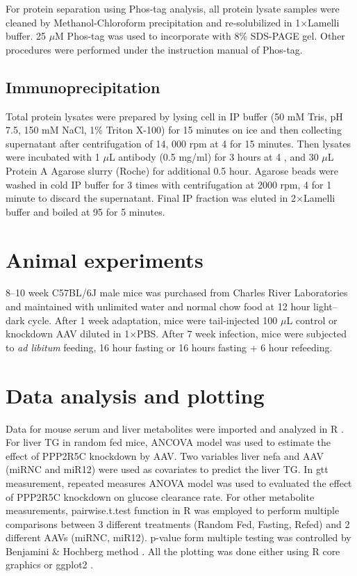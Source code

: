 For protein separation using Phos-tag\textsuperscript{\textregistered} analysis, all protein lysate samples were cleaned by Methanol-Chloroform precipitation  \cite{wessel_method_1984} and re-solubilized in 1$\times$Lamelli buffer. 25 $\mu$M Phos-tag\textsuperscript{\textregistered} was used to incorporate with 8\% SDS-PAGE gel. Other procedures were performed under the instruction manual of Phos-tag\textsuperscript{\textregistered}. 

\subsection{Immunoprecipitation}

Total protein lysates were prepared by lysing cell in IP buffer (50 mM Tris, pH 7.5, 150 mM NaCl, 1\% Triton X-100) for 15 minutes on ice and then collecting supernatant after centrifugation of 14, 000 rpm at 4 \celsius{} for 15 minutes. Then lysates were incubated with 1 $\mu$L antibody (0.5 mg/ml) for 3 hours at 4 \celsius, and 30 $\mu$L Protein A Agarose slurry (Roche) for additional 0.5 hour. Agarose beads were washed in cold IP buffer for 3 times with centrifugation at 2000 rpm, 4 \celsius{} for 1 minute to discard the supernatant. Final IP fraction was eluted in 2$\times$Lamelli buffer and boiled at 95 \celsius{} for 5 minutes.

\section{Animal experiments}

8--10 week C57BL/6J male mice was purchased from Charles River Laboratories and maintained with unlimited water and normal chow food at 12 hour light--dark cycle. After 1 week adaptation, mice were tail-injected 100 $\mu$L control or knockdown \gls{AAV} diluted in 1$\times$PBS. After 7 week infection, mice were subjected to \textit{ad libitum} feeding, 16 hour fasting or 16 hours fasting + 6 hour refeeding.

\section{Data analysis and plotting}

Data for mouse serum and liver metabolites were imported and analyzed in R  \cite{r_core_team_r:_2014}. For liver TG in random fed mice, ANCOVA model was used to estimate the effect of PPP2R5C knockdown by \gls{AAV}. Two variables liver \gls{nefa} and \gls{AAV} (miRNC and miR12) were used as covariates to predict the liver TG. In \gls{gtt} measurement, repeated measures ANOVA model was used to evaluated the effect of PPP2R5C knockdown on glucose clearance rate. For other metabolite measurements, pairwise.t.test function in R was employed to perform multiple comparisons between 3 different treatments (Random Fed, Fasting, Refed) and 2 different \gls{AAV}s (miRNC, miR12). p-value form multiple testing was controlled by Benjamini \& Hochberg method \cite{benjamini_controlling_1995}. All the plotting was done either using R core graphics or ggplot2  \cite{wickham_ggplot2:_2009}.






 


